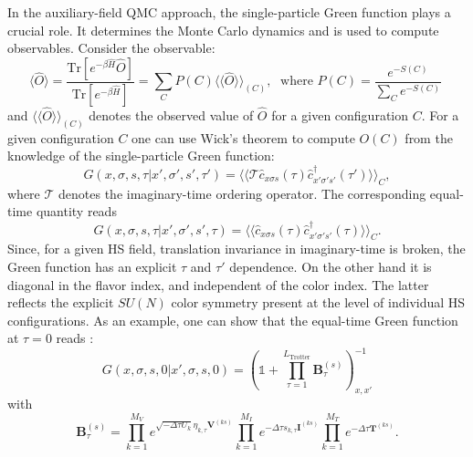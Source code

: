 In the auxiliary-field QMC approach, the single-particle Green function plays a crucial role.  It determines the Monte Carlo dynamics and is used to compute  observables. Consider the observable:
\begin{equation}\label{eqn:obs}
\langle \hat{O}  \rangle  = \frac{ \text{Tr}   \left[ e^{- \beta \hat{H}}  \hat{O}  \right] }{ \text{Tr}   \left[ e^{- \beta \hat{H}}  \right] } =   \sum_{C}   P(C) 
   \langle \langle \hat{O}  \rangle \rangle_{(C)} ,
   \; \text{ where } 
  P(C)   = \frac{ e^{-S(C)}}{\sum_C e^{-S(C)}}\;
\end{equation}
and $\langle \langle \hat{O}  \rangle \rangle_{(C)} $ denotes the observed value of $\hat{O}$ for a given configuration $C$.
For a given configuration $C$  one can use Wick's theorem to compute $O (C) $   from the knowledge of the single-particle Green function: 
\begin{equation}
       G( x,\sigma,s, \tau |    x',\sigma',s', \tau')   =       \langle \langle \mathcal{T} \hat{c}^{\phantom\dagger}_{x \sigma s} (\tau)  \hat{c}^{\dagger}_{x' \sigma' s'} (\tau') \rangle \rangle_{C},
\end{equation}
where $ \mathcal{T} $ denotes the imaginary-time ordering operator.   The  corresponding equal-time quantity reads
\begin{equation}
       G( x,\sigma,s, \tau |    x',\sigma',s', \tau)   =       \langle \langle  \hat{c}^{\phantom\dagger}_{x \sigma s} (\tau)  \hat{c}^{\dagger}_{x' \sigma' s'} (\tau) \rangle \rangle_{C}.
\end{equation}
Since, for a given HS field, translation invariance in imaginary-time is broken, the Green function has an explicit $\tau$ and $\tau'$ dependence.   On the other hand it is diagonal in the flavor index, and independent of the color index. The latter reflects the  explicit $SU(N)$   color symmetry present at the level of individual HS configurations.   As an example,  one can show that the equal-time Green function at $\tau = 0$ reads \cite{Assaad08_rev}:
\begin{equation}\label{eqn:Green_eq}
G(x,\sigma,s,0| x',\sigma,s,0 )  =   \left(  \mathds{1}  +  \prod_{\tau = 1}^{L_{\text{Trotter}}}  \bm{B}_{\tau}^{(s)}   \right)^{-1}_{x,x'}
\end{equation}
with
\begin{equation}
\label{Btau.eq}
	\bm{B}_{\tau}^{(s)} =   
    \prod_{k=1}^{M_V}   e^{  \sqrt{ -\Delta \tau  U_k} \eta_{k,\tau} {\bm V}^{(ks)} }   \prod_{k=1}^{M_I}   e^{  -\Delta \tau s_{k,\tau}  {\bm I}^{(ks)}}
    \prod_{k=1}^{M_T}   e^{-\Delta \tau {\bm T}^{(ks)}} .
\end{equation}


